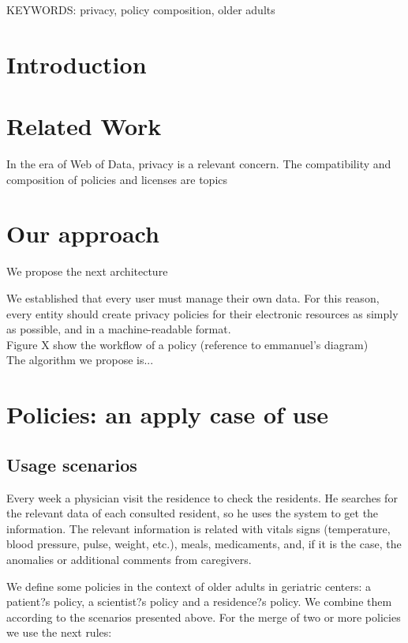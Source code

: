 \documentclass[10pt,letterpaper,oneside,draft]{article}
\begin{document}
KEYWORDS: privacy, policy composition, older adults

\section{Introduction}

\section{Related Work}

In the era of Web of Data, privacy is a relevant concern. The compatibility and composition of policies and licenses are topics 

\section{Our approach}

We propose the next architecture

We established that every user must manage their own data. For this reason, every entity should create privacy policies for their electronic resources as simply as possible, and in a machine-readable format.
\\
Figure X show the workflow of a policy (reference to emmanuel's diagram)
\\

The algorithm we propose is...


\section{Policies: an apply case of use}

\subsection{Usage scenarios}
Every week a physician visit the residence to check the residents. He searches for the relevant data of each consulted resident, so he uses the system to get the information. The relevant information is  related with vitals signs (temperature, blood pressure, pulse, weight, etc.), meals, medicaments, and, if it is the case, the anomalies or additional comments from caregivers.

We define some policies in the context of older adults in geriatric centers: a patient?s policy, a scientist?s policy and a residence?s policy. We combine them according to the scenarios presented above. For the merge of two or more policies we use the next rules:
\end{document}
